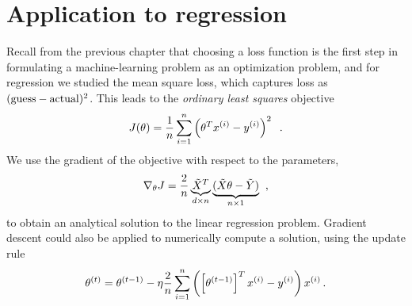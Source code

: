 



\section{Application to regression}

\label{sec-gd_ridge}

Recall from the previous chapter that choosing a loss function is the
first step in formulating a machine-learning problem as an
optimization problem, and for regression we studied the mean square
loss, which captures loss as
$({\rm guess} - {\rm actual})^2$.
This leads to the {\em ordinary least squares} objective
\begin{equation}
  J(\theta) = \frac{1}{n}\sum_{i =
    1}^n\left(\theta^Tx^{(i)} - y^{(i)}\right)^2 \;\;.
\end{equation}
We use the gradient of the objective with respect to the parameters,
\begin{equation}
  \nabla_{\theta}J = \frac{2}{n}\underbrace{\tilde{X}^T}_{d \times
    n}\underbrace{(\tilde{X}\theta - \tilde{Y})}_{n \times 1}\;\;,
  \label{eq:reg_gd_deriv}
\end{equation}
to obtain an
analytical solution to the linear regression problem.  Gradient
descent could also be applied to numerically compute a solution, using
the update rule
\begin{equation}
  \theta^{(t)} = \theta^{(t-1)} - \eta \frac{2}{n} \sum_{i=1}^{n} \left( \left[ \theta^{(t-1)}\right]^T x^{(i)} - y^{(i)} \right) x^{(i)}
  \,.
\end{equation}
{~\hfill ~}


